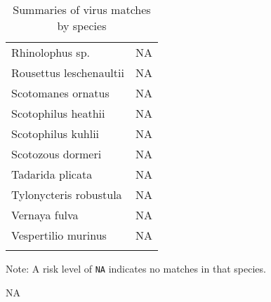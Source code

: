 \documentclass[11pt,article,oneside]{article}
\begin{document}
\begin{longtable}[c]{@{}lr@{}}
Rhinolophus sp. & NA
\\\addlinespace
Rousettus leschenaultii & NA
\\\addlinespace
Scotomanes ornatus & NA
\\\addlinespace
Scotophilus heathii & NA
\\\addlinespace
Scotophilus kuhlii & NA
\\\addlinespace
Scotozous dormeri & NA
\\\addlinespace
Tadarida plicata & NA
\\\addlinespace
Tylonycteris robustula & NA
\\\addlinespace
Vernaya fulva & NA
\\\addlinespace
Vespertilio murinus & NA
\\\addlinespace
\bottomrule
\addlinespace
\caption{Summaries of virus matches by species}
\end{longtable}

Note: A risk level of \texttt{NA} indicates no matches in that species.

NA
\end{document}
